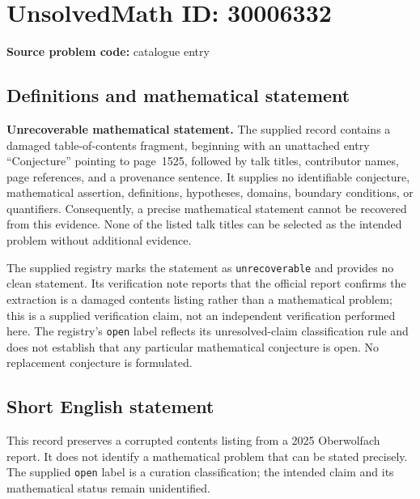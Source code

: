\documentclass[11pt]{article}
\begin{document}
\section*{UnsolvedMath ID: 30006332}
\textbf{Source problem code:} catalogue entry
\subsection{Definitions and mathematical statement}
\textbf{Unrecoverable mathematical statement.} The supplied record contains a damaged table-of-contents fragment, beginning with an unattached entry ``Conjecture'' pointing to page~1525, followed by talk titles, contributor names, page references, and a provenance sentence. It supplies no identifiable conjecture, mathematical assertion, definitions, hypotheses, domains, boundary conditions, or quantifiers. Consequently, a precise mathematical statement cannot be recovered from this evidence. None of the listed talk titles can be selected as the intended problem without additional evidence.

The supplied registry marks the statement as \texttt{unrecoverable} and provides no clean statement. Its verification note reports that the official report confirms the extraction is a damaged contents listing rather than a mathematical problem; this is a supplied verification claim, not an independent verification performed here. The registry's \texttt{open} label reflects its unresolved-claim classification rule and does not establish that any particular mathematical conjecture is open. No replacement conjecture is formulated.
\subsection{Short English statement}
This record preserves a corrupted contents listing from a 2025 Oberwolfach report. It does not identify a mathematical problem that can be stated precisely. The supplied \texttt{open} label is a curation classification; the intended claim and its mathematical status remain unidentified.
\end{document}
